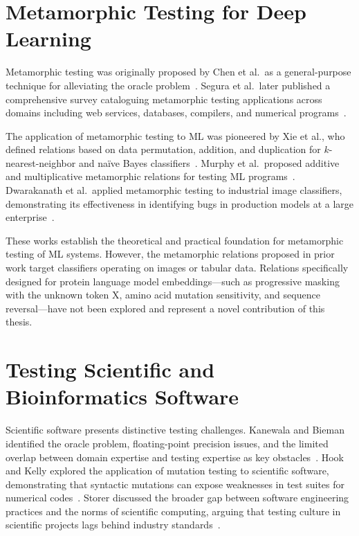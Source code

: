 \section{Metamorphic Testing for Deep Learning}\label{sec:rw-metamorphic}

Metamorphic testing was originally proposed by Chen et al.\ as a general-purpose technique for alleviating the oracle problem~\cite{chen1998metamorphic}. Segura et al.\ later published a comprehensive survey cataloguing metamorphic testing applications across domains including web services, databases, compilers, and numerical programs~\cite{segura2016survey}.

The application of metamorphic testing to \ac{ML} was pioneered by Xie et al., who defined relations based on data permutation, addition, and duplication for $k$-nearest-neighbor and na\"ive Bayes classifiers~\cite{xie2011testing}. Murphy et al.\ proposed additive and multiplicative metamorphic relations for testing \ac{ML} programs~\cite{murphy2008properties}. Dwarakanath et al.\ applied metamorphic testing to industrial image classifiers, demonstrating its effectiveness in identifying bugs in production models at a large enterprise~\cite{dwarakanath2018identifying}.

These works establish the theoretical and practical foundation for metamorphic testing of \ac{ML} systems. However, the metamorphic relations proposed in prior work target classifiers operating on images or tabular data. Relations specifically designed for protein language model embeddings---such as progressive masking with the unknown token X, amino acid mutation sensitivity, and sequence reversal---have not been explored and represent a novel contribution of this thesis.

\section{Testing Scientific and Bioinformatics Software}\label{sec:rw-scientific}

Scientific software presents distinctive testing challenges. Kanewala and Bieman identified the oracle problem, floating-point precision issues, and the limited overlap between domain expertise and testing expertise as key obstacles~\cite{kanewala2014testing}. Hook and Kelly explored the application of mutation testing to scientific software, demonstrating that syntactic mutations can expose weaknesses in test suites for numerical codes~\cite{hook2009mutation}. Storer discussed the broader gap between software engineering practices and the norms of scientific computing, arguing that testing culture in scientific projects lags behind industry standards~\cite{storer2017bridging}.

